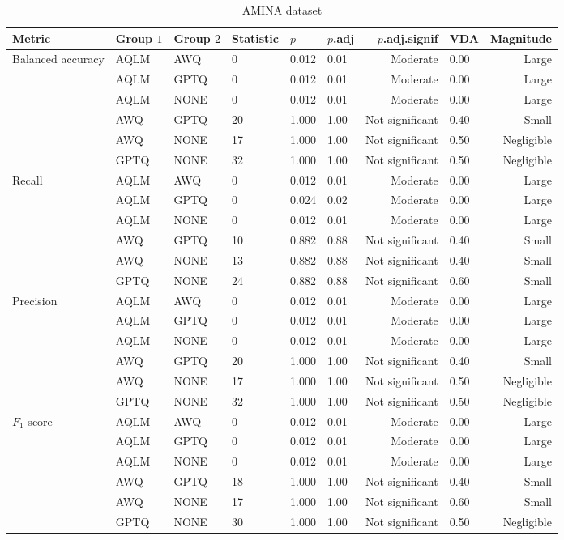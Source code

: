 \begin{table}[H]
\centering
\caption*{AMINA dataset}
\begin{tabular}{llllllrlr}
\toprule
Metric & Group $1$ & Group $2$ & Statistic & $p$ & $p$.adj & $p$.adj.signif & VDA & Magnitude\\
\midrule
Balanced accuracy & AQLM & AWQ & 0 & 0.012 & 0.01 & Moderate & 0.00 & Large \\
\phantom & AQLM & GPTQ & 0 & 0.012 & 0.01 & Moderate & 0.00 & Large \\
\phantom & AQLM & NONE & 0 & 0.012 & 0.01 & Moderate & 0.00 & Large \\
\phantom & AWQ & GPTQ & 20 & 1.000 & 1.00 & Not significant & 0.40 & Small \\
\phantom & AWQ & NONE & 17 & 1.000 & 1.00 & Not significant & 0.50 & Negligible \\
\phantom & GPTQ & NONE & 32 & 1.000 & 1.00 & Not significant & 0.50 & Negligible \\
\midrule
Recall & AQLM & AWQ & 0 & 0.012 & 0.01 & Moderate & 0.00 & Large \\
\phantom & AQLM & GPTQ & 0 & 0.024 & 0.02 & Moderate & 0.00 & Large \\
\phantom & AQLM & NONE & 0 & 0.012 & 0.01 & Moderate & 0.00 & Large \\
\phantom & AWQ & GPTQ & 10 & 0.882 & 0.88 & Not significant & 0.40 & Small \\
\phantom & AWQ & NONE & 13 & 0.882 & 0.88 & Not significant & 0.40 & Small \\
\phantom & GPTQ & NONE & 24 & 0.882 & 0.88 & Not significant & 0.60 & Small \\
\midrule
Precision & AQLM & AWQ & 0 & 0.012 & 0.01 & Moderate & 0.00 & Large \\
\phantom & AQLM & GPTQ & 0 & 0.012 & 0.01 & Moderate & 0.00 & Large \\
\phantom & AQLM & NONE & 0 & 0.012 & 0.01 & Moderate & 0.00 & Large \\
\phantom & AWQ & GPTQ & 20 & 1.000 & 1.00 & Not significant & 0.40 & Small \\
\phantom & AWQ & NONE & 17 & 1.000 & 1.00 & Not significant & 0.50 & Negligible \\
\phantom & GPTQ & NONE & 32 & 1.000 & 1.00 & Not significant & 0.50 & Negligible \\
\midrule
$F_1$-score & AQLM & AWQ & 0 & 0.012 & 0.01 & Moderate & 0.00 & Large \\
\phantom & AQLM & GPTQ & 0 & 0.012 & 0.01 & Moderate & 0.00 & Large \\
\phantom & AQLM & NONE & 0 & 0.012 & 0.01 & Moderate & 0.00 & Large \\
\phantom & AWQ & GPTQ & 18 & 1.000 & 1.00 & Not significant & 0.40 & Small \\
\phantom & AWQ & NONE & 17 & 1.000 & 1.00 & Not significant & 0.60 & Small \\
\phantom & GPTQ & NONE & 30 & 1.000 & 1.00 & Not significant & 0.50 & Negligible \\\end{tabular}
\label{tab:RQ1_posthoc_full}
\end{table}
